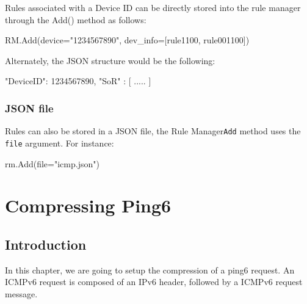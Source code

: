 Rules associated with a Device ID can be directly stored into the rule manager through the Add() method as follows:

\begin{termc}[backgroundcolor=\color{gray!10}, basicstyle=\ttfamily\small, escapechar=@, language=Python]
RM.Add(device="1234567890", dev_info=[rule1100, rule001100])
\end{termc}

Alternately, the JSON structure would be the following:

\begin{termc}[backgroundcolor=\color{gray!10}, basicstyle=\ttfamily\small, escapechar=@]
{
    "DeviceID": 1234567890,
    "SoR" : [ ..... ]
}
\end{termc}

\subsection{JSON file}

Rules can also be stored in a JSON file, the Rule Manager\texttt{Add} method uses the \texttt{file} argument. For instance:

\begin{termc}[backgroundcolor=\color{gray!10}, basicstyle=\ttfamily\small, escapechar=@, language=Python]
rm.Add(file="icmp.json")
\end{termc}



\chapter{Compressing Ping6}

\section{Introduction}

In this chapter, we are going to setup the compression of a ping6 request. An ICMPv6 request is composed of an IPv6 header, followed by a ICMPv6 request message.

